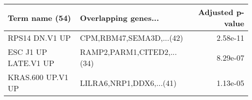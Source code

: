 \begin{tabular}{llr}
\toprule
      Term name (54) &       Overlapping genes... &  Adjusted p-value \\
\midrule
      RPS14 DN.V1 UP &   CPM,RBM47,SEMA3D,...(42) &          2.58e-11 \\
ESC J1 UP LATE.V1 UP & RAMP2,PARM1,CITED2,...(34) &          8.29e-07 \\
   KRAS.600 UP.V1 UP &   LILRA6,NRP1,DDX6,...(41) &          1.13e-05 \\
\bottomrule
\end{tabular}
